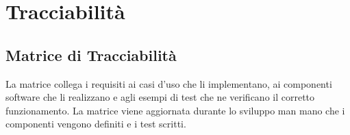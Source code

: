 \documentclass[12pt, a4paper]{article}
\begin{document}
\section{Tracciabilità}

\subsection{Matrice di Tracciabilità}

La matrice collega i requisiti ai casi d'uso che li implementano, ai componenti software
che li realizzano e agli esempi di test che ne verificano il corretto funzionamento.
La matrice viene aggiornata durante lo sviluppo man mano che i componenti vengono
definiti e i test scritti.
\end{document}
